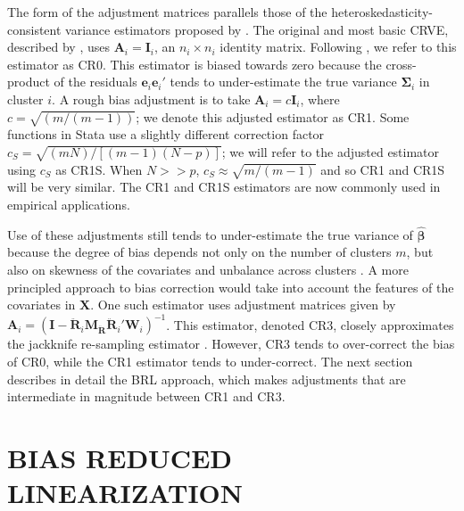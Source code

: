 \documentclass[12pt]{article}\usepackage[]{graphicx}\usepackage[]{color}
\newcommand{\bm}{\mathbf}
\newcommand{\bs}{\boldsymbol}
\begin{document}
The form of the adjustment matrices parallels those of the heteroskedasticity-consistent variance estimators proposed by \citet*{MacKinnon1985some}. 
The original and most basic CRVE, described by \citet{Liang1986longitudinal}, uses $\bm{A}_i = \bm{I}_i$, an $n_i \times n_i$ identity matrix. 
Following \citet{Cameron2015practitioners}, we refer to this estimator as CR0. 
This estimator is biased towards zero because the cross-product of the residuals $\bm{e}_i \bm{e}_i'$ tends to under-estimate the true variance $\bs\Sigma_i$ in cluster $i$.
A rough bias adjustment is to take $\bm{A}_i = c\bm{I}_i$, where $c = \sqrt{(m/(m-1))}$; we denote this adjusted estimator as CR1. Some functions in Stata use a slightly different correction factor $c_S = \sqrt{(m N)/[(m - 1)(N - p)]}$; we will refer to the adjusted estimator using $c_S$ as CR1S. When $N >> p$, $c_S \approx \sqrt{m/(m-1)}$ and so CR1 and CR1S will be very similar.
The CR1 and CR1S estimators are now commonly used in empirical applications.

Use of these adjustments still tends to under-estimate the true variance of $\hat{\bs\beta}$ because the degree of bias depends not only on the number of clusters $m$, but also on skewness of the covariates and unbalance across clusters \citep{Carter2013asymptotic, MacKinnon2013thirty, Cameron2015practitioners, Young2016improved}. 
A more principled approach to bias correction would take into account the features of the covariates in $\bm{X}$. 
One such estimator uses adjustment matrices given by $\bm{A}_i = \left(\bm{I} - \bm{\ddot{R}}_i \bm{M_{\ddot{R}}}\bm{\ddot{R}}_i'\bm{W}_i\right)^{-1}$. This estimator, denoted CR3, closely approximates the jackknife re-sampling estimator \citep{Bell2002bias, Mancl2001covariance}.  
However, CR3 tends to over-correct the bias of CR0, while the CR1 estimator tends to under-correct. 
The next section describes in detail the BRL approach, which makes adjustments that are intermediate in magnitude between CR1 and CR3. 


\section{BIAS REDUCED LINEARIZATION}
\label{sec:BRL}
\end{document}
